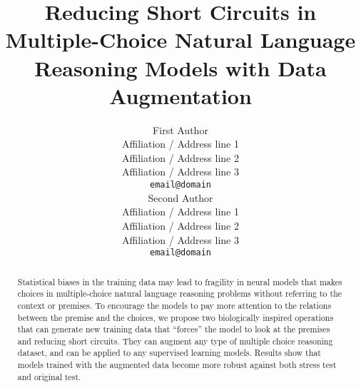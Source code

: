 \documentclass[11pt]{article}
\title{Reducing Short Circuits in Multiple-Choice Natural Language Reasoning Models with Data Augmentation}
\author{First Author \\
  Affiliation / Address line 1 \\
  Affiliation / Address line 2 \\
  Affiliation / Address line 3 \\
  \texttt{email@domain} \\\And
  Second Author \\
  Affiliation / Address line 1 \\
  Affiliation / Address line 2 \\
  Affiliation / Address line 3 \\
  \texttt{email@domain} \\}
\date{}
\begin{document}
\maketitle
\begin{abstract}
Statistical biases in the training data may lead to fragility in 
neural models that makes choices in multiple-choice natural language 
reasoning problems without referring to the context or premises. 
To encourage the models to pay more attention to the relations between 
the premise and the choices, we propose two biologically inspired operations 
that can generate new training data that ``forces'' the model
to look at the premises and reducing short circuits. They can augment
any type of multiple choice reasoning dataset, and can be applied to
any supervised learning models. Results show that models trained
with the augmented data become more robust against both stress test  
and original test.
\end{abstract}






\newpage


\clearpage
\appendix

%
\end{document}

